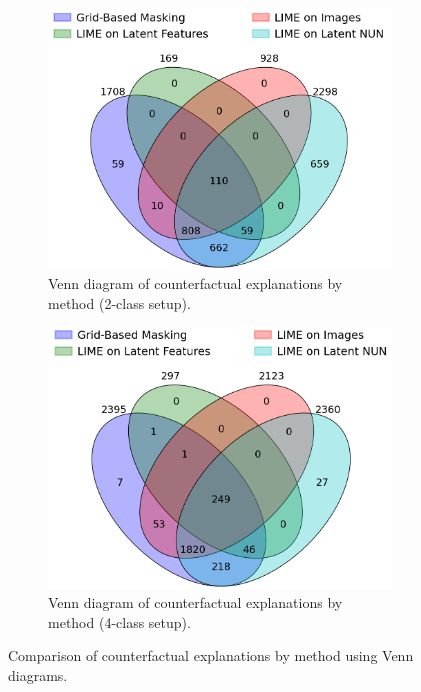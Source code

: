 \begin{figure}[htbp]
    \centering
    \begin{subfigure}{0.45\textwidth}
        \centering
        \includegraphics[width=\textwidth]{img/masking_results/venn_2_class.png}
        \caption{Venn diagram of counterfactual explanations by method (2-class setup).}
        \label{fig:venn_binary}
    \end{subfigure}
    \hfill
    \begin{subfigure}{0.45\textwidth}
        \centering
        \includegraphics[width=\textwidth]{img/masking_results/venn_4_class.png}
        \caption{Venn diagram of counterfactual explanations by method (4-class setup).}
        \label{fig:venn_multi}
    \end{subfigure}
    \caption{Comparison of counterfactual explanations by method using Venn diagrams.}
    \label{fig:venn_comparison}
\end{figure}

